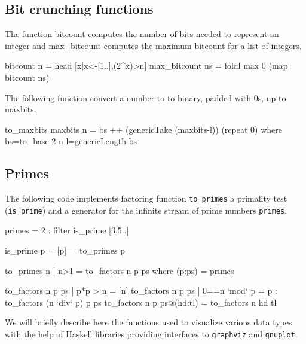 \documentclass[]{INCLUDES/llncs}
\begin{document}
\subsection*{Bit crunching functions} 

The function
bitcount computes the number of bits needed to represent an integer and
max\_bitcount computes the maximum bitcount for a list of integers.
\begin{code}
bitcount n = head [x|x<-[1..],(2^x)>n]
max_bitcount ns = foldl max 0 (map bitcount ns)
\end{code}

The following function convert a number to to binary, padded with 0s, up to maxbits.
\begin{code}
to_maxbits maxbits n = 
  bs ++ (genericTake (maxbits-l)) (repeat 0) where 
    bs=to_base 2 n
    l=genericLength bs
\end{code}

\subsection*{Primes}
The following code implements factoring function {\tt to\_primes} a primality
test ({\tt is\_prime}) and a generator for the infinite stream of prime numbers
{\tt primes}.

\begin{code}
primes = 2 : filter is_prime [3,5..]

is_prime p = [p]==to_primes p

to_primes n | n>1 = to_factors n p ps where 
  (p:ps) = primes

to_factors n p ps | p*p > n = [n]
to_factors n p ps | 0==n `mod` p = p : to_factors (n `div` p)  p ps 
to_factors n p ps@(hd:tl) = to_factors n hd tl
\end{code}

We will briefly describe here the functions used to visualize various data
types with the help of Haskell libraries providing interfaces to {\tt graphviz}
and {\tt gnuplot}.
\end{document}
